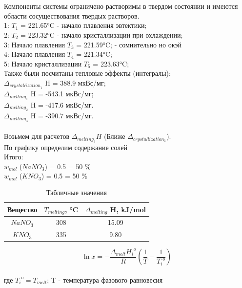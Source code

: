 \documentclass[a4paper,12pt]{article} %
\begin{document}
\begin{enumerate}
\quad \\
\\ Компоненты системы ограничено растворимы в твердом состоянии и имеются области сосуществования твердых растворов.
\\1: $T_1$ = 221.65°C - начало плавления эвтектики;
\\2: $T_2$ = 223.32°C - начало кристаллизации при охлаждении;
\\3: Начало плавления $T_3$ = 221.59°C; - сомнительно но окэй
\\4: Начало плавления $T_4$ = 221.34°C;
\\5: Начало кристаллизации $T_5$  = 223.63°C; 
\\ Также были посчитаны тепловые эффекты (интегралы):
\\ $\Delta_{{crystallization}_1}$ H = 388.9 мкВс/мг;
\\ $\Delta_{{melting}_1}$ H = -543.1 мкВс/мг;
\\ $\Delta_{{melting}_2}$ H = -417.6 мкВс/мг.
\\ $\Delta_{{melting}_3}$ H = -390.7 мкВс/мг.
\quad \\ 
\\ Возьмем для расчетов $\Delta_{melting_3}H$ (Ближе $\Delta_{crystallization_1}$).
\\По графику определим содержание солей 
\\ Итого:
\\ $w_{mol}$ (${NaNO}_3$) = 0.5 = 50 $\%$
\\ $w_{mol}$ (${KNO}_3$) = 0.5 = 50 $\%$
\\\begin{table}[H]
    \begin{center}
        \begin{tabular}{|c|c|c|}
        \hline
           Вещество & $T_{melting}$, °C & $\Delta_{{melting}}$ H, kJ/mol \\\hline
          ${NaNO}_3$ & 308 & 15.09 \\\hline
          ${KNO}_3$ & 335 & 9.80 \\\hline
        \end{tabular}
        \caption{Табличные значения}
    \end{center}
\end{table}
\begin{equation}
    \ln{x} = -\frac{\Delta_{melt} {H_i}^{o}}{R}(\frac{1}{T}-\frac{1}{{T_i}^{o}}) 
\end{equation}
\\где ${T_i}^{o} = T_{melt}$; T - температура фазового равновесия


\end{enumerate}
\end{document}
